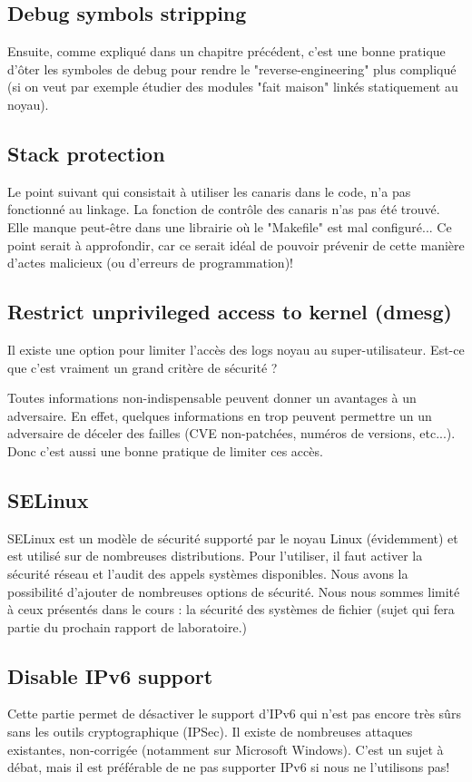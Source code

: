 \subsection{Debug symbols stripping}
Ensuite, comme expliqué dans un chapitre précédent, c'est une bonne pratique d'ôter les symboles de debug pour rendre le "reverse-engineering" plus compliqué (si on veut par exemple étudier des modules "fait maison" linkés statiquement au noyau).\\

\subsection{Stack protection}
Le point suivant qui consistait à utiliser les canaris dans le code, n'a pas fonctionné au linkage. La fonction de contrôle des canaris n'as pas été trouvé. Elle manque peut-être dans une librairie où le "Makefile" est mal configuré... Ce point serait à approfondir, car ce serait idéal de pouvoir prévenir de cette manière d'actes malicieux (ou d'erreurs de programmation)!\\

\subsection{Restrict	unprivileged	 access to kernel (dmesg)}
Il existe une option pour limiter l'accès des logs noyau au super-utilisateur. Est-ce que c'est vraiment un grand critère de sécurité ?

Toutes informations non-indispensable peuvent donner un avantages à un adversaire. En effet, quelques informations en trop peuvent permettre un un adversaire de déceler des failles (CVE non-patchées, numéros de versions, etc...). Donc c'est aussi une bonne pratique de limiter ces accès.
	
\subsection{SELinux}
SELinux est un modèle de sécurité supporté par le noyau Linux (évidemment) et est utilisé sur de nombreuses distributions. Pour l'utiliser, il faut activer la sécurité réseau et l'audit des appels systèmes disponibles. Nous avons la possibilité d'ajouter de nombreuses options de sécurité. Nous nous sommes limité à ceux présentés dans le cours : la sécurité des systèmes de fichier (sujet qui fera partie du prochain rapport de laboratoire.)

\subsection{Disable IPv6 support}
Cette partie permet de désactiver le support d'IPv6 qui n'est pas encore très sûrs sans les outils cryptographique (IPSec). Il existe de nombreuses attaques existantes, non-corrigée (notamment sur Microsoft Windows). C'est un sujet à débat, mais il est préférable de ne pas supporter IPv6 si nous ne l'utilisons pas!


